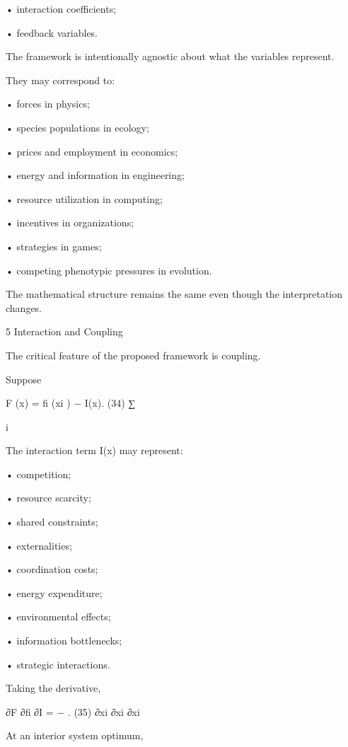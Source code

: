 \documentclass[10pt,a4paper]{article}
\begin{document}
\begin{ManuscriptText}
    • interaction coefficients;

    • feedback variables.


The framework is intentionally agnostic about what the variables represent.

They may correspond to:


    • forces in physics;

    • species populations in ecology;

    • prices and employment in economics;

    • energy and information in engineering;

    • resource utilization in computing;

    • incentives in organizations;

    • strategies in games;

    • competing phenotypic pressures in evolution.


The mathematical structure remains the same even though the interpretation changes.


5     Interaction and Coupling

The critical feature of the proposed framework is coupling.

Suppose


                                     F (x) =        fi (xi ) − I(x).                  (34)
                                               ∑︂

                                               i


The interaction term I(x) may represent:


    • competition;

    • resource scarcity;

    • shared constraints;

    • externalities;

    • coordination costs;

    • energy expenditure;


    • environmental effects;

    • information bottlenecks;

    • strategic interactions.


Taking the derivative,

                                        ∂F    ∂fi   ∂I
                                            =     −    .                                    (35)
                                        ∂xi   ∂xi ∂xi

At an interior system optimum,


\end{ManuscriptText}
\end{document}
